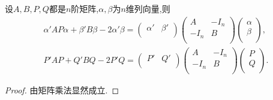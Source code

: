 \documentclass[../../main.tex]{subfiles}
\begin{document}
\begin{lemma}\label{lemma:矩阵二次型技巧}
设$A,B,P,Q$都是$n$阶矩阵,$\alpha,\beta$为$n$维列向量,则
\begin{align*}
\alpha ' AP\alpha +\beta ' B\beta -2\alpha ' \beta =\left( \begin{matrix}
\alpha '&		\beta '\\
\end{matrix} \right) \left( \begin{matrix}
A&		-I_n\\
-I_n&		B\\
\end{matrix} \right) \left( \begin{array}{c}
\alpha\\
\beta\\
\end{array} \right) ,
\\
P' AP+Q' BQ-2P' Q=\left( \begin{matrix}
P'&		Q'\\
\end{matrix} \right) \left( \begin{matrix}
A&		-I_n\\
-I_n&		B\\
\end{matrix} \right) \left( \begin{array}{c}
P\\
Q\\
\end{array} \right) .
\end{align*}
\end{lemma}
\begin{proof}
由矩阵乘法显然成立.

\end{proof}
\end{document}
